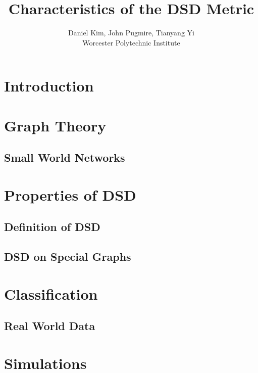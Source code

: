 \documentclass[11pt,oneside]{report}
\theoremstyle{definition}
\begin{document}
\title{Characteristics of the DSD Metric}
\author{Daniel Kim, John Pugmire, Tianyang Yi\\Worcester Polytechnic Institute\\}
\maketitle
\tableofcontents


\chapter{Introduction}

\chapter{Graph Theory}

\section{Small World Networks}



\chapter{Properties of DSD}
\section{Definition of DSD}


\section{DSD on Special Graphs}



\chapter{Classification}

\section{Real World Data}


\chapter{Simulations}
\end{document}
